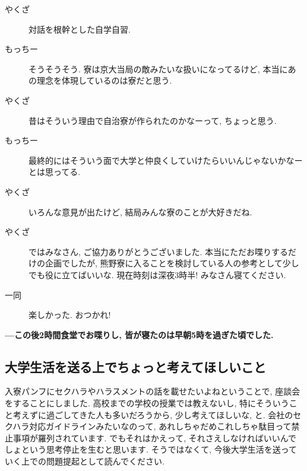 \documentclass[10pt,b5jsbook,dvips,dvipdfmx,openany]{jsbook}
\theoremstyle{definition}
\begin{document}
\begin{description}
		\item[やくざ]対話を根幹とした自学自習.
		\item[もっちー]そうそうそう. 寮は京大当局の敵みたいな扱いになってるけど, 本当にあの理念を体現しているのは寮だと思う.
		\item[やくざ]昔はそういう理由で自治寮が作られたのかなーって, ちょっと思う.
		\item[もっちー]最終的にはそういう面で大学と仲良くしていけたらいいんじゃないかなーとは思ってる.
		\item[やくざ]いろんな意見が出たけど, 結局みんな寮のことが大好きだね.
		\item[やくざ]ではみなさん, ご協力ありがとうございました. 本当にただお喋りするだけの企画でしたが, 熊野寮に入ることを検討している人の参考として少しでも役に立てばいいな. 現在時刻は深夜3時半! みなさん寝てください.
		\item[ 一同 ]楽しかった. おつかれ!
		\end{description}
		\textbf{---この後2時間食堂でお喋りし, 皆が寝たのは早朝5時を過ぎた頃でした. }
\normalsize

		\subsection{大学生活を送る上でちょっと考えてほしいこと}

		 入寮パンフにセクハラやハラスメントの話を載せたいよねということで, 座談会をすることにしました. 高校までの学校の授業では教えないし, 特にそういうこと考えずに過ごしてきた人も多いだろうから, 少し考えてほしいな, と. 会社のセクハラ対応ガイドラインみたいなのって, あれしちゃだめこれしちゃ駄目って禁止事項が羅列されています. でもそれはかえって, それさえしなければいいんでしょという思考停止を生むと思います. そうではなくて, 今後大学生活を送っていく上での問題提起として読んでください.
		 
\end{document}
